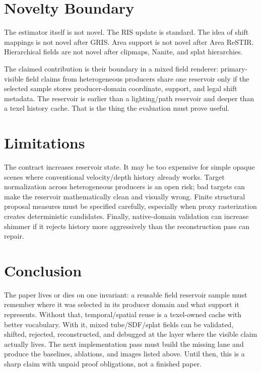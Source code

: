 \documentclass[11pt]{article}
\newcommand{\AreaReSTIR}{Area ReSTIR}
\newcommand{\GRIS}{GRIS}
\begin{document}
\section{Novelty Boundary}

The estimator itself is not novel.  The RIS update is standard.  The idea of
shift mappings is not novel after \GRIS.  Area support is not novel after
\AreaReSTIR.  Hierarchical fields are not novel after clipmaps, Nanite, and
splat hierarchies.

The claimed contribution is their boundary in a mixed field renderer:
primary-visible field claims from heterogeneous producers share one reservoir
only if the selected sample stores producer-domain coordinate, support, and
legal shift metadata.  The reservoir is earlier than a lighting/path reservoir
and deeper than a texel history cache.  That is the thing the evaluation must
prove useful.

\section{Limitations}

The contract increases reservoir state.  It may be too expensive for simple
opaque scenes where conventional velocity/depth history already works.  Target
normalization across heterogeneous producers is an open risk; bad targets can
make the reservoir mathematically clean and visually wrong.  Finite structural
proposal measures must be specified carefully, especially when proxy
rasterization creates deterministic candidates.  Finally, native-domain
validation can increase shimmer if it rejects history more aggressively than
the reconstruction pass can repair.

\section{Conclusion}

The paper lives or dies on one invariant: a reusable field reservoir sample
must remember where it was selected in its producer domain and what support it
represents.  Without that, temporal/spatial reuse is a texel-owned cache with
better vocabulary.  With it, mixed tube/SDF/splat fields can be validated,
shifted, rejected, reconstructed, and debugged at the layer where the visible
claim actually lives.  The next implementation pass must build the missing lane
and produce the baselines, ablations, and images listed above.  Until then, this
is a sharp claim with unpaid proof obligations, not a finished paper.
\end{document}
